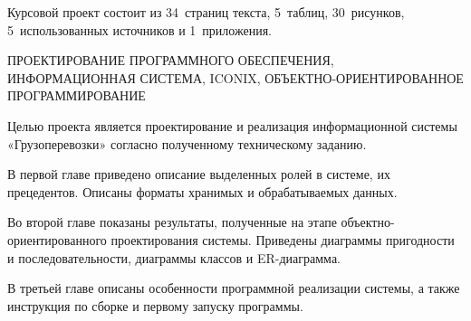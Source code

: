 \label{chap:abstract}

Курсовой проект состоит из 
34~страниц текста, 
5~таблиц, 
30~рисунков, 
5~использованных источников и 
1~приложения.

\MakeUppercase{
Проектирование программного обеспечения, информационная система, 
ICONIX, объектно-ориентированное программирование
}

Целью проекта является проектирование и реализация информационной 
системы «Грузоперевозки» согласно полученному техническому заданию. 

В первой главе приведено описание выделенных ролей в системе, их 
прецедентов. Описаны форматы хранимых и обрабатываемых данных. 
 
Во второй главе показаны результаты, полученные на этапе 
\mbox{объектно-ориентированного} проектирования системы. 
Приведены диаграммы пригодности и последовательности, 
диаграммы классов и ER-диаграмма. 
 
В третьей главе описаны особенности программной реализации системы, 
а также инструкция по сборке и первому запуску программы.
